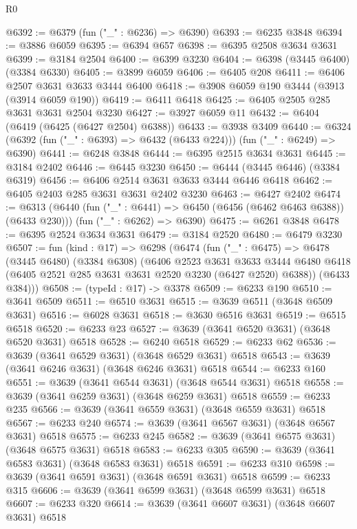 \begin{lexlean}{R0}
\begin{coremodule}
@6392 := @6379 (fun ("_" : @6236) => @6390)
@6393 := @6235 @3848
@6394 := @3886 @6059
@6395 := @6394 @657
@6398 := @6395 @2508 @3634 @3631
@6399 := @3184 @2504
@6400 := @6399 @3230
@6404 := @6398 (@3445 @6400) (@3384 @6330)
@6405 := @3899 @6059
@6406 := @6405 @208
@6411 := @6406 @2507 @3631 @3633 @3444 @6400
@6418 := @3908 @6059 @190 @3444 (@3913 (@3914 @6059 @190))
@6419 := @6411 @6418
@6425 := @6405 @2505 @285 @3631 @3631 @2504 @3230
@6427 := @3927 @6059 @11
@6432 := @6404 (@6419 (@6425 (@6427 @2504) @6388))
@6433 := @3938 @3409
@6440 := @6324 (@6392 (fun ("_" : @6393) => @6432 (@6433 @224))) (fun ("_" : @6249) => @6390)
@6441 := @6248 @3848
@6444 := @6395 @2515 @3634 @3631
@6445 := @3184 @2402
@6446 := @6445 @3230
@6450 := @6444 (@3445 @6446) (@3384 @6319)
@6456 := @6406 @2514 @3631 @3633 @3444 @6446 @6418
@6462 := @6405 @2403 @285 @3631 @3631 @2402 @3230
@6463 := @6427 @2402
@6474 := @6313
    (@6440 (fun ("_" : @6441) => @6450 (@6456 (@6462 @6463 @6388)) (@6433 @230)))
    (fun ("_" : @6262) => @6390)
@6475 := @6261 @3848
@6478 := @6395 @2524 @3634 @3631
@6479 := @3184 @2520
@6480 := @6479 @3230
@6507 := fun (kind : @17) =>
  @6298
    (@6474
      (fun ("_" : @6475) =>
      @6478
        (@3445 @6480)
        (@3384 @6308)
        (@6406
          @2523
          @3631
          @3633
          @3444
          @6480
          @6418
          (@6405 @2521 @285 @3631 @3631 @2520 @3230 (@6427 @2520) @6388))
        (@6433 @384)))
@6508 := (typeId : @17) -> @3378
@6509 := @6233 @190
@6510 := @3641 @6509
@6511 := @6510 @3631
@6515 := @3639 @6511 (@3648 @6509 @3631)
@6516 := @6028 @3631
@6518 := @3630 @6516 @3631
@6519 := @6515 @6518
@6520 := @6233 @23
@6527 := @3639 (@3641 @6520 @3631) (@3648 @6520 @3631) @6518
@6528 := @6240 @6518
@6529 := @6233 @62
@6536 := @3639 (@3641 @6529 @3631) (@3648 @6529 @3631) @6518
@6543 := @3639 (@3641 @6246 @3631) (@3648 @6246 @3631) @6518
@6544 := @6233 @160
@6551 := @3639 (@3641 @6544 @3631) (@3648 @6544 @3631) @6518
@6558 := @3639 (@3641 @6259 @3631) (@3648 @6259 @3631) @6518
@6559 := @6233 @235
@6566 := @3639 (@3641 @6559 @3631) (@3648 @6559 @3631) @6518
@6567 := @6233 @240
@6574 := @3639 (@3641 @6567 @3631) (@3648 @6567 @3631) @6518
@6575 := @6233 @245
@6582 := @3639 (@3641 @6575 @3631) (@3648 @6575 @3631) @6518
@6583 := @6233 @305
@6590 := @3639 (@3641 @6583 @3631) (@3648 @6583 @3631) @6518
@6591 := @6233 @310
@6598 := @3639 (@3641 @6591 @3631) (@3648 @6591 @3631) @6518
@6599 := @6233 @315
@6606 := @3639 (@3641 @6599 @3631) (@3648 @6599 @3631) @6518
@6607 := @6233 @320
@6614 := @3639 (@3641 @6607 @3631) (@3648 @6607 @3631) @6518

\end{coremodule}
\end{lexlean}
